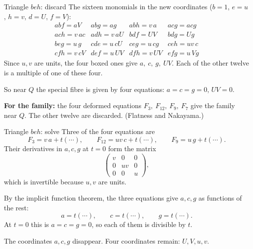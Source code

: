 \begin{frame}{Triangle \(beh\): discard}
The sixteen monomials in the new coordinates (\(b=1\), \(e=u\), \(h=v\), \(d=U\), \(f=V\)):
\[
\begin{array}{llll}
abf=aV&abg=ag&\boxed{abh=v\,a}&acg=acg\\[2pt]
ach=v\,ac&adh=v\,aU&\boxed{bdf=UV}&bdg=Ug\\[2pt]
\boxed{beg=u\,g}&cde=u\,cU&ceg=u\,cg&\boxed{ceh=uv\,c}\\[2pt]
cfh=v\,cV&def=u\,UV&dfh=v\,UV&efg=u\,Vg
\end{array}
\]
Since \(u,v\) are units, the four boxed ones give \(a,\ c,\ g,\ UV\). Each of the other twelve is a multiple of one of these four.
\par\medskip
So near \(Q\) the special fibre is given by four equations: \(a=c=g=0\), \(UV=0\).
\par\medskip
\textbf{For the family:} the four deformed equations \(F_3,\ F_{12},\ F_9,\ F_7\) give the family near \(Q\). The other twelve are discarded. (Flatness and Nakayama.)
\end{frame}

\begin{frame}{Triangle \(beh\): solve}
Three of the four equations are
\[
F_3=v\,a+t(\cdots),\qquad F_{12}=uv\,c+t(\cdots),\qquad F_9=u\,g+t(\cdots).
\]
Their derivatives in \(a,c,g\) at \(t=0\) form the matrix
\[
\begin{pmatrix}v&0&0\\0&uv&0\\0&0&u\end{pmatrix},
\]
which is invertible because \(u,v\) are units.
\par\medskip
By the implicit function theorem, the three equations give \(a,c,g\) as functions of the rest:
\[
\boxed{a=t(\cdots),\qquad c=t(\cdots),\qquad g=t(\cdots).}
\]
At \(t=0\) this is \(a=c=g=0\), so each of them is divisible by \(t\).
\par\medskip
The coordinates \(a,c,g\) disappear. Four coordinates remain: \(U,V,u,v\).
\end{frame}

